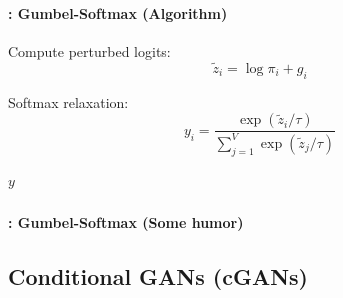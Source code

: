 \documentclass[xcolor=table]{beamer}
\begin{document}
	\begin{frame}[fragile]
		\frametitle{\insertshortsubtitle}
		\framesubtitle{\insertsection: Gumbel-Softmax (Algorithm)}
		
		\scriptsize
		
		\begin{algorithm}[H]
			
			
			Compute perturbed logits:
			\[
			\tilde{z}_i = \log \pi_i + g_i
			\]
			
			Softmax relaxation:
			\[
			y_i = \frac{\exp(\tilde{z}_i / \tau)}{\sum_{j=1}^V \exp(\tilde{z}_j / \tau)}
			\]
			
			\Return $y$
			
			\caption{Gumbel-Softmax reparameterization trick}
		\end{algorithm}
		
	\end{frame}
	
	\begin{frame}
		\frametitle{\insertshortsubtitle}
		\framesubtitle{\insertsection: Gumbel-Softmax (Some humor)}
		
		\begin{center}
		\end{center}
	\end{frame}
	
	\subsection{Conditional GANs (cGANs)}
	
\end{document}

